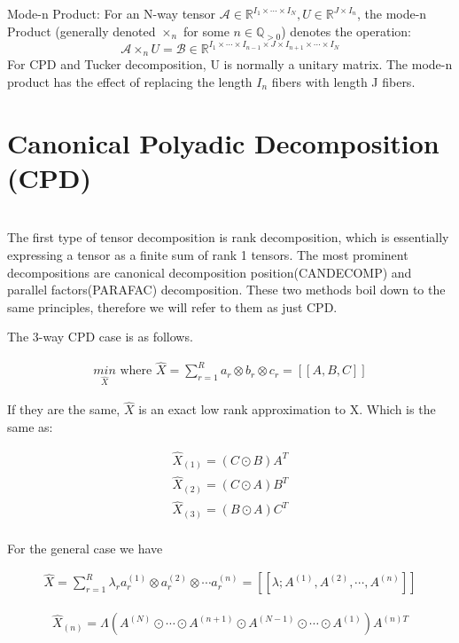 \documentclass[11pt]{article}
\newcommand\0{\mathbf{0}}
\newcommand\QQ{\mathbb{Q}}
\newcommand\RR{\mathbb{R}}
\newcommand\<{\langle}
\renewcommand\>{\rangle}
\begin{document}
Mode-n Product: For an N-way tensor $\mathcal{A}\in \RR^{I_1 \times \cdots \times I_N},U\in \RR^{J\times I_n} $, the mode-n Product (generally denoted $\times_n$ for some $n \in \QQ_{>0}$) denotes the operation: $$\mathcal{A} \times_n U=\mathcal{B}\in\RR^{I_1\times \cdots \times I_{n-1} \times J\times I_{n+1}\times\cdots\times I_N}$$
For CPD and Tucker decomposition, U is normally a unitary matrix. The mode-n product has the effect of replacing the length $I_n$ fibers with length J fibers.



\section{Canonical Polyadic Decomposition (CPD)}\\

The first type of tensor decomposition is rank decomposition, which is essentially expressing 
a tensor as a finite sum of rank 1 tensors. The most prominent decompositions are canonical decomposition position(CANDECOMP) and parallel factors(PARAFAC) decomposition. These two methods boil down to the same principles, therefore we will refer to them as just CPD.

The 3-way CPD case is as follows.

\begin{align*}
\underset{\hat{X}}{min} \text{ where } \hat{X} = \sum_{r=1}^{R}a_{r} \otimes b_{r} \otimes c_{r} = [[A,B,C]]
\end{align*}

If they are the same, $\hat X$ is an exact low rank approximation to X. Which is the same as:

\begin{align*}
    \hat X_{(1)}=(C \odot B)A^{T}\\
    \hat X_{(2)}=(C \odot A)B^{T}\\
    \hat X_{(3)}=(B \odot A)C^{T}\\
\end{align*}

For the general case we have

\begin{align*}
\hat X = \sum_{r=1}^{R} \lambda_r a_r^{(1)}\otimes a_r^{(2)} \otimes \cdots a_r^{(n)}
= [[\lambda; A^{(1)}, A^{(2)},\cdots , A^{(n)}]]
\end{align*}

\begin{align*}
\hat X_{(n)} = \Lambda(A^{(N)} \odot \cdots \odot A^{(n+1)} \odot A^{(N-1)} \odot \cdots \odot A^{(1)} )A^{(n)T}
\end{align*}
\end{document}
